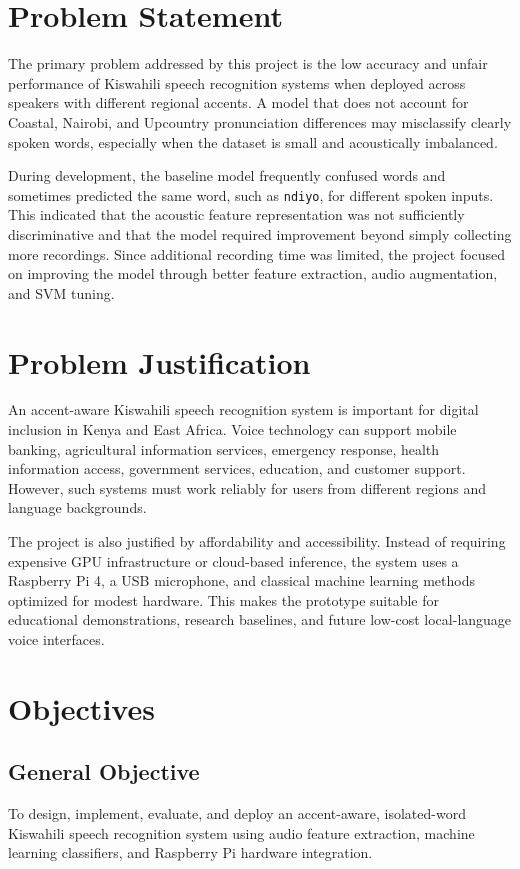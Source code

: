 \documentclass[12pt,a4paper]{report}
\begin{document}
\section{Problem Statement}
The primary problem addressed by this project is the low accuracy and unfair performance of Kiswahili speech recognition systems when deployed across speakers with different regional accents. A model that does not account for Coastal, Nairobi, and Upcountry pronunciation differences may misclassify clearly spoken words, especially when the dataset is small and acoustically imbalanced.

During development, the baseline model frequently confused words and sometimes predicted the same word, such as \texttt{ndiyo}, for different spoken inputs. This indicated that the acoustic feature representation was not sufficiently discriminative and that the model required improvement beyond simply collecting more recordings. Since additional recording time was limited, the project focused on improving the model through better feature extraction, audio augmentation, and SVM tuning.

\section{Problem Justification}
An accent-aware Kiswahili speech recognition system is important for digital inclusion in Kenya and East Africa. Voice technology can support mobile banking, agricultural information services, emergency response, health information access, government services, education, and customer support. However, such systems must work reliably for users from different regions and language backgrounds.

The project is also justified by affordability and accessibility. Instead of requiring expensive GPU infrastructure or cloud-based inference, the system uses a Raspberry Pi 4, a USB microphone, and classical machine learning methods optimized for modest hardware. This makes the prototype suitable for educational demonstrations, research baselines, and future low-cost local-language voice interfaces.

\section{Objectives}

\subsection{General Objective}
To design, implement, evaluate, and deploy an accent-aware, isolated-word Kiswahili speech recognition system using audio feature extraction, machine learning classifiers, and Raspberry Pi hardware integration.
\end{document}
